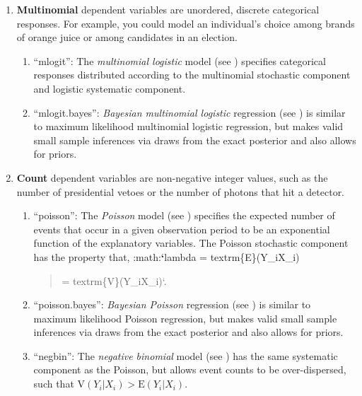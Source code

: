 \documentclass[letterpaper,10pt,english]{sphinxmanual}
\begin{document}
\begin{enumerate}
\begin{enumerate}
\end{enumerate}

\item {} 
\textbf{Multinomial} dependent variables are unordered, discrete
categorical responses. For example, you could model an individual’s
choice among brands of orange juice or among candidates in an
election.
\begin{enumerate}
\item {} 
“mlogit”: The \emph{multinomial logistic} model (see ) specifies
categorical responses distributed according to the multinomial
stochastic component and logistic systematic component.

\item {} 
“mlogit.bayes”: \emph{Bayesian multinomial logistic} regression (see )
is similar to maximum likelihood multinomial logistic regression,
but makes valid small sample inferences via draws from the exact
posterior and also allows for priors.

\end{enumerate}

\item {} 
\textbf{Count} dependent variables are non-negative integer values, such
as the number of presidential vetoes or the number of photons that
hit a detector.
\begin{enumerate}
\item {} 
“poisson”: The \emph{Poisson} model (see ) specifies the expected
number of events that occur in a given observation period to be an
exponential function of the explanatory variables. The Poisson
stochastic component has the property that,
:math:{\color{red}\bfseries{}{}`}lambda = textrm\{E\}(Y\_i\textbar{}X\_i)
\begin{quote}

= textrm\{V\}(Y\_i\textbar{}X\_i){}`.
\end{quote}

\item {} 
“poisson.bayes”: \emph{Bayesian Poisson} regression (see ) is similar
to maximum likelihood Poisson regression, but makes valid small
sample inferences via draws from the exact posterior and also
allows for priors.

\item {} 
“negbin”: The \emph{negative binomial} model (see ) has the same
systematic component as the Poisson, but allows event counts to be
over-dispersed, such that
\(\textrm{V}(Y_i|X_i) > \textrm{E}(Y_i|X_i)\).

\end{enumerate}


\end{enumerate}
\end{document}
